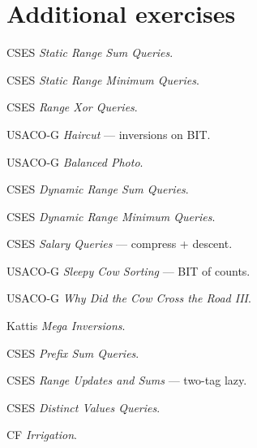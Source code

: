 \section{Additional exercises}
\begin{exercise}[easy] CSES \emph{Static Range Sum Queries}. \end{exercise}
\begin{exercise}[easy] CSES \emph{Static Range Minimum Queries}. \end{exercise}
\begin{exercise}[easy] CSES \emph{Range Xor Queries}. \end{exercise}
\begin{exercise}[easy] USACO-G \emph{Haircut} --- inversions on BIT. \end{exercise}
\begin{exercise}[easy] USACO-G \emph{Balanced Photo}. \end{exercise}
\begin{exercise}[medium] CSES \emph{Dynamic Range Sum Queries}. \end{exercise}
\begin{exercise}[medium] CSES \emph{Dynamic Range Minimum Queries}. \end{exercise}
\begin{exercise}[medium] CSES \emph{Salary Queries} --- compress + descent. \end{exercise}
\begin{exercise}[medium] USACO-G \emph{Sleepy Cow Sorting} --- BIT of counts. \end{exercise}
\begin{exercise}[medium] USACO-G \emph{Why Did the Cow Cross the Road III}. \end{exercise}
\begin{exercise}[medium] Kattis \emph{Mega Inversions}. \end{exercise}
\begin{exercise}[hard] CSES \emph{Prefix Sum Queries}. \end{exercise}
\begin{exercise}[hard] CSES \emph{Range Updates and Sums} --- two-tag lazy. \end{exercise}
\begin{exercise}[hard] CSES \emph{Distinct Values Queries}. \end{exercise}
\begin{exercise}[hard] CF \emph{Irrigation}. \end{exercise}

